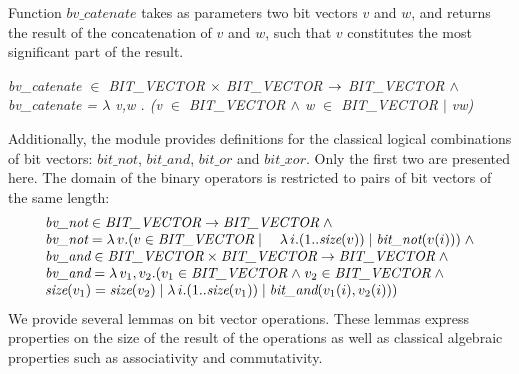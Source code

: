 \documentclass[a4paper]{llncs}
\begin{document}
Function $bv\_catenate$ takes as parameters two bit vectors $v$ and
$w$, and returns the result of the concatenation of $v$ and $w$, such
that $v$ constitutes the most significant part of the result.




\hspace*{0.00in} \it bv\_catenate  $\in$  \it BIT\_VECTOR  $\times$  \it BIT\_VECTOR  $\rightarrow$ \it
BIT\_VECTOR $\land$\\
\hspace*{0.21in} \it bv\_catenate \rm =  $\lambda$  v\rm ,\it w \rm . \rm (\it v 
$\in$  \it BIT\_VECTOR $\land$ \it w $\in$  \it BIT\_VECTOR  $\mid$  \it v\^ \it w\rm ) %

%
%


Additionally, the module provides definitions for the classical
logical combinations of bit vectors: $\textit{bit\_not}$,
$\textit{bit\_and}$, $\textit{bit\_or}$ and $\textit{bit\_xor}$. Only
the first two are presented here. The domain of the binary operators
is restricted to pairs of bit vectors of the same length:
$$
\begin{array}{l}
\textit{bv\_not} \in \textit{BIT\_VECTOR} \fun \textit{BIT\_VECTOR} \land \\
\textit{bv\_not} = \lambda v . (v \in \textit{BIT\_VECTOR} \mid \quad \lambda i . (1 .. \textit{size}(v)) \mid \textit{bit\_not}(v(i))) \land \\
\textit{bv\_and} \in \textit{BIT\_VECTOR} \times \textit{BIT\_VECTOR} \fun \textit{BIT\_VECTOR} \land \\
\textit{bv\_and} = \lambda v_1, v_2 . (v_1 \in \textit{BIT\_VECTOR} \land v_2 \in \textit{BIT\_VECTOR} \land \\
\textit{size}(v_1) = \textit{size}(v_2) \mid \lambda i . (1 .. \textit{size}(v_1)) \mid
\textit{bit\_and}(v_1(i), v_2(i)))
\end{array}
$$
We provide several lemmas on bit vector operations. These lemmas
express properties on the size of the result of the operations
as well as classical algebraic properties such as associativity
and commutativity.
\end{document}
